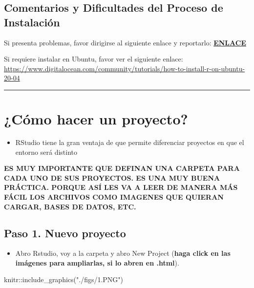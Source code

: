 \documentclass[
]{article}
\newenvironment{Shaded}{}{}
\newcommand{\FunctionTok}[1]{\textcolor[rgb]{0.02,0.16,0.49}{#1}}
\newcommand{\NormalTok}[1]{#1}
\newcommand{\SpecialCharTok}[1]{\textcolor[rgb]{0.25,0.44,0.63}{#1}}
\newcommand{\StringTok}[1]{\textcolor[rgb]{0.25,0.44,0.63}{#1}}
\providecommand{\tightlist}{%
  \setlength{\itemsep}{0pt}\setlength{\parskip}{0pt}}
\begin{document}
\hypertarget{comentarios-y-dificultades-del-proceso-de-instalaciuxf3n}{%
\subsection{Comentarios y Dificultades del Proceso de
Instalación}\label{comentarios-y-dificultades-del-proceso-de-instalaciuxf3n}}

Si presenta problemas, favor dirigirse al siguiente enlace y reportarlo:
{
\href{https://docs.google.com/forms/d/e/1FAIpQLSdPhIwiY_7at09GM-KkAgklmWHamWcWaPY-yeoPVMoWeIRI2w/viewform?usp=sf_link}{\textbf{ENLACE}}
}

Si requiere instalar en Ubuntu, favor ver el siguiente enlace:
\url{https://www.digitalocean.com/community/tutorials/how-to-install-r-on-ubuntu-20-04}

\begin{center}\rule{0.5\linewidth}{0.5pt}\end{center}

\hypertarget{cuxf3mo-hacer-un-proyecto}{%
\section{¿Cómo hacer un proyecto?}\label{cuxf3mo-hacer-un-proyecto}}

\begin{itemize}
\tightlist
\item
  RStudio tiene la gran ventaja de que permite diferenciar proyectos en
  que el entorno será distinto
\end{itemize}

\textbf{ES MUY IMPORTANTE QUE DEFINAN UNA CARPETA PARA CADA UNO DE SUS
PROYECTOS. ES UNA MUY BUENA PRÁCTICA. PORQUE ASÍ LES VA A LEER DE MANERA
MÁS FÁCIL LOS ARCHIVOS COMO IMAGENES QUE QUIERAN CARGAR, BASES DE DATOS,
ETC.}

\hypertarget{paso-1.-nuevo-proyecto}{%
\subsection{Paso 1. Nuevo proyecto}\label{paso-1.-nuevo-proyecto}}

\begin{itemize}
\tightlist
\item
  Abro Rstudio, voy a la carpeta y abro New Project (\textbf{haga click
  en las imágenes para ampliarlas, si lo abren en .html}).
\end{itemize}

\begin{Shaded}
\begin{Highlighting}[]
\NormalTok{knitr}\SpecialCharTok{::}\FunctionTok{include\_graphics}\NormalTok{(}\StringTok{"./figs/1.PNG"}\NormalTok{)}
\end{Highlighting}
\end{Shaded}
\end{document}
